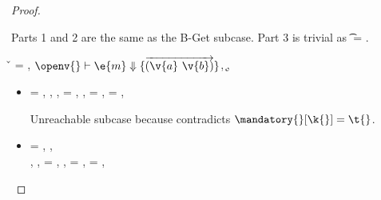 \begin{lemma}
\begin{proof}
\begin{case}[B-Get]
\begin{itemize}
\begin{subcase}[T-GetHMapPartialDefault]
         Parts 1 and 2 are the same as the B-Get subcase.
         Part 3 is trivial as \t{} = \Top.
      \end{subcase}
  \end{itemize}
\end{case}

\begin{case}[B-GetMissing]
        \v{} = \nil,
        $\opsem {\openv{}}
        {\e{m}} {\curlymap{\overrightarrow{({\v{a}}\ {\v{b}})}}}$,
       \opsem {\openv{}} {} {\k{}},

  \begin{itemize}
    \item[]
      \begin{subcase}[T-GetHMap]
  \ep{} = { {}},
  \judgementrewrite {\propenv{}} {} {\Unionsplice {\overrightarrow {\HMapgeneric {\mandatory{}} {\absent{}}}}}
           { {}}
           {}
           {},
  \judgementtworewrite {\propenv{}} {} {}{},
  \e{} = { {}},
  ,
  \thenprop{\prop{}} = {\topprop{}},
  \elseprop{\prop{}} = {\topprop{}},

       Unreachable subcase because 
       contradicts ${\inmandatory{\k{}}{\t{}}{\mandatory{}}}$.
      \end{subcase}
    \item[]
      \begin{subcase}[T-GetHMapAbsent]
  \ep{} = { {}},
  \judgementtworewrite {\propenv{}} {} {} {},
  \\
  \judgementrewrite {\propenv{}} {} {\HMapgeneric {\mandatory{}} {\absent}}
           { {}}
           {}
           {},
  {\inabsent{\k{}}{\absent{}}},
  \e{} = { {}},
  \issubtypein{}{\Nil}{\t{}},
  \thenprop{\prop{}} = {\topprop{}},
  \elseprop{\prop{}} = {\topprop{}},


\end{subcase}
\end{itemize}
\end{case}
\end{proof}
\end{lemma}
